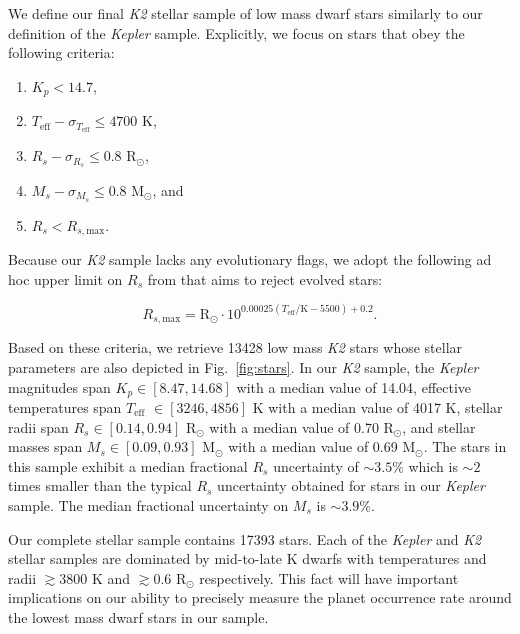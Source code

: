 \documentclass[twocolumn]{emulateapj}
\newcommand{\kepler}[1]{\emph{Kepler}#1}
\newcommand{\ktwo}[1]{\emph{K2}#1}
\newcommand{\teff}[1]{$T_{\text{eff}}$#1}
\begin{document}
We define our final \ktwo{} stellar sample of low mass dwarf stars similarly to our definition of the \kepler{} sample.
Explicitly, we focus on stars that obey the following criteria:

\begin{enumerate}
\item $K_p < 14.7$,
\item $T_{\text{eff}} - \sigma_{T_{\text{eff}}} \leq 4700$ K,
\item $R_s - \sigma_{R_s} \leq 0.8$ R$_{\odot}$,
\item $M_s - \sigma_{M_s} \leq 0.8$ M$_{\odot}$, and
\item $R_s < R_{s,\text{max}}$.
\end{enumerate}

\noindent Because our \ktwo{} sample lacks any evolutionary flags, we adopt the following ad hoc upper limit on $R_s$
from \cite{fulton17} that aims to reject evolved stars:

\begin{equation}
  R_{s,\text{max}} = \text{R}_{\odot} \cdot 10^{0.00025(T_{\text{eff}}/\text{K}-5500)+0.2}.
\end{equation}

\noindent Based on these criteria, we retrieve 13428 low mass \ktwo{} stars whose
stellar parameters are also depicted in Fig.~\ref{fig:stars}.
In our \ktwo{} sample, the \kepler{} magnitudes span $K_p \in [8.47, 14.68]$ with a median value of 14.04,
effective temperatures span \teff{} $\in [3246, 4856]$ K with a median value of 4017 K,
stellar radii span $R_s \in [0.14, 0.94]$ R$_{\odot}$ with a median value of 0.70 R$_{\odot}$, and
stellar masses span $M_s \in [0.09, 0.93]$ M$_{\odot}$ with a median value of 0.69 M$_{\odot}$.
The stars in this sample exhibit a median fractional $R_s$ uncertainty of $\sim 3.5$\% which is $\sim 2$
times smaller than the typical $R_s$ uncertainty obtained for stars in our \kepler{} sample.
The median fractional uncertainty on $M_s$ is $\sim 3.9$\%.

Our complete stellar sample contains 17393 stars.
Each of the \kepler{} and \ktwo{} stellar samples are dominated by mid-to-late K dwarfs
with temperatures and radii $\gtrsim 3800$ K and $\gtrsim 0.6$ R$_{\odot}$ respectively. This
fact will have important implications on our ability to precisely measure the planet occurrence
rate around the lowest mass dwarf stars in our sample.
\end{document}
